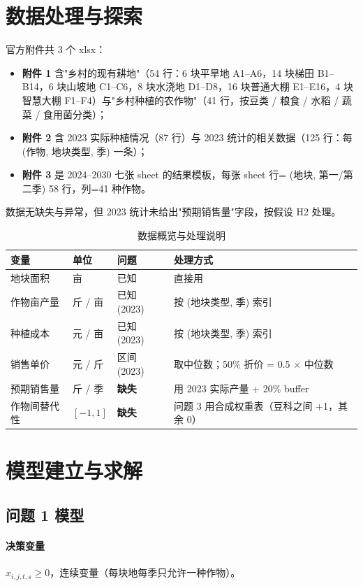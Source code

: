 \documentclass[UTF8,a4paper,12pt]{ctexart}
\begin{document}
\section{数据处理与探索}
官方附件共 3 个 xlsx：
\begin{itemize}
  \item \textbf{附件 1} 含"乡村的现有耕地"（54 行：6 块平旱地 A1--A6，14 块梯田 B1--B14，6 块山坡地 C1--C6，8 块水浇地 D1--D8，16 块普通大棚 E1--E16，4 块智慧大棚 F1--F4）与"乡村种植的农作物"（41 行，按豆类 / 粮食 / 水稻 / 蔬菜 / 食用菌分类）；
  \item \textbf{附件 2} 含 2023 实际种植情况（87 行）与 2023 统计的相关数据（125 行：每 (作物, 地块类型, 季) 一条）；
  \item \textbf{附件 3} 是 2024--2030 七张 sheet 的结果模板，每张 sheet 行= (地块, 第一/第二季) 58 行，列=41 种作物。
\end{itemize}
数据无缺失与异常，但 2023 统计未给出"预期销售量"字段，按假设 H2 处理。

\begin{table}[H]
  \centering
  \caption{数据概览与处理说明}
  \label{tab:data-overview}
  \begin{tabular}{llll}
    \toprule
    变量 & 单位 & 问题 & 处理方式 \\
    \midrule
    地块面积 & 亩 & 已知 & 直接用 \\
    作物亩产量 & 斤 / 亩 & 已知 (2023) & 按 (地块类型, 季) 索引 \\
    种植成本 & 元 / 亩 & 已知 (2023) & 按 (地块类型, 季) 索引 \\
    销售单价 & 元 / 斤 & 区间 (2023) & 取中位数；50\% 折价 = 0.5 $\times$ 中位数 \\
    预期销售量 & 斤 / 季 & \textbf{缺失} & 用 2023 实际产量 + 20\% buffer \\
    作物间替代性 & $[-1,1]$ & \textbf{缺失} & 问题 3 用合成权重表（豆科之间 +1，其余 0） \\
    \bottomrule
  \end{tabular}
\end{table}

\section{模型建立与求解}

\subsection{问题 1 模型}
\paragraph{决策变量} $x_{i,j,t,s} \ge 0$，连续变量（每块地每季只允许一种作物）。
\end{document}
